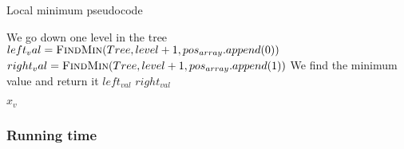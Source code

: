 \documentclass{article}
\begin{document}
\begin{algorithm}[H]
\caption{Local minimum pseudocode}
\begin{algorithmic}[1]
  \State We go down one level in the tree
  \State $left_val = \Call{FindMin}{Tree,level+1,pos_{array}.append(0)}$
  \State $right_val = \Call{FindMin}{Tree,level+1,pos_{array}.append(1)}$
  \State
  \State We find the minimum value and return it
   \State \Return $left_{val}$
  \Else
   \State \Return $right_{val}$
  \EndIf
 \EndIf

  \State \Return $x_v$
 \EndIf
\EndFunction
\end{algorithmic}
\end{algorithm}

\subsubsection*{Running time}
\end{document}
